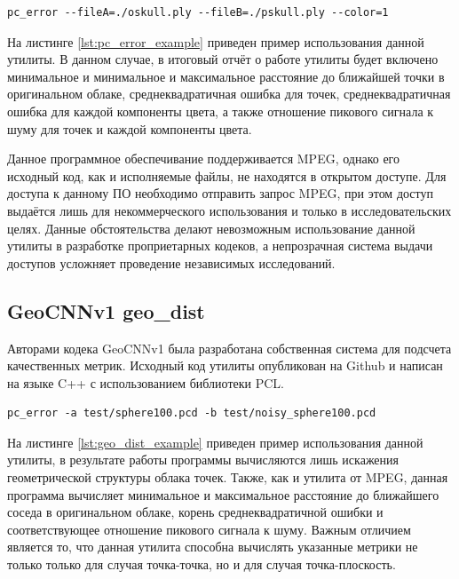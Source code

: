 \begin{lstlisting}[caption={
    Пример использования утилиты mpeg-pcc-dmetric, параметр fileA -
    оригинальное облако, fileB - реконструированное облако, color=1 - также
    вычисляются значения искажения цветов.
}, label={lst:pc_error_example}]
pc_error --fileA=./oskull.ply --fileB=./pskull.ply --color=1
\end{lstlisting}

На листинге \ref{lst:pc_error_example} приведен пример использования данной
утилиты. В данном случае, в итоговый отчёт о работе утилиты будет включено
минимальное и минимальное и максимальное расстояние до ближайшей точки в
оригинальном облаке, среднеквадратичная ошибка для точек, среднеквадратичная
ошибка для каждой компоненты цвета, а также отношение пикового сигнала к шуму
для точек и каждой компоненты цвета.

Данное программное обеспечивание поддерживается MPEG, однако его исходный код,
как и исполняемые файлы, не находятся в открытом доступе. Для доступа к данному
ПО необходимо отправить запрос MPEG, при этом доступ выдаётся лишь для
некоммерческого использования и только в исследовательских целях. Данные
обстоятельства делают невозможным использование данной утилиты в разработке
проприетарных кодеков, а непрозрачная система выдачи доступов усложняет
проведение независимых исследований.

\subsection{GeoCNNv1 geo\_dist}

Авторами кодека GeoCNNv1\cite{GeoCNNv1} была разработана собственная система для
подсчета качественных метрик. Исходный код утилиты опубликован на
Github\cite{GeoDistGithub} и написан на языке C++ с использованием библиотеки
PCL.

\begin{lstlisting}[caption={
    Пример использования утилиты geo\_dist, параметр a - оригинальное облако, b
    - реконструированное облако.
}, label={lst:geo_dist_example}]
pc_error -a test/sphere100.pcd -b test/noisy_sphere100.pcd
\end{lstlisting}

На листинге \ref{lst:geo_dist_example} приведен пример использования данной
утилиты, в результате работы программы вычисляются лишь искажения геометрической
структуры облака точек. Также, как и утилита от MPEG, данная программа вычисляет
минимальное и максимальное расстояние до ближайшего соседа в оригинальном
облаке, корень среднеквадратичной ошибки и соответствующее отношение пикового
сигнала к шуму. Важным отличием является то, что данная утилита способна
вычислять указанные метрики не только только для случая точка-точка, но и для
случая точка-плоскость.

